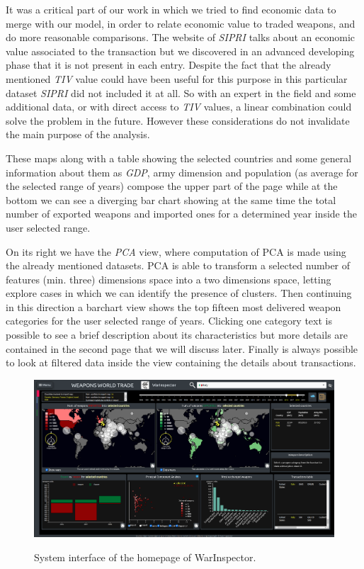 \documentclass{article}
\begin{document}
\begin{multicols}{2}
It was a critical part of our work in which we tried to find economic data to merge with our model, in order to relate economic value to traded weapons, and do more reasonable comparisons. The website of \textit{SIPRI} talks about an economic value associated to the transaction but we discovered in an advanced developing phase that it is not present in each entry. Despite the fact that the already mentioned \textit{TIV} value could have been useful for this purpose in this particular dataset \textit{SIPRI} did not included it at all. So with an expert in the field and some additional data, or with direct access to \textit{TIV} values, a linear combination could solve the problem in the future. However these considerations do not invalidate the main purpose of the analysis.

These maps along with a table showing the selected countries and some general information about them as \textit{GDP}, army dimension and population (as average for the selected range of years) compose the upper part of the page while at the bottom we can see a diverging bar chart showing at the same time the total number of exported weapons and imported ones for a determined year inside the user selected range. 

On its right we have the \textit{PCA} view, where computation of PCA is made using the already mentioned datasets. PCA is able to transform a selected number of features (min. three) dimensions space into a two dimensions space, letting explore cases in which we can identify the presence of clusters. Then continuing in this direction a barchart view shows the top fifteen most delivered weapon categories for the user selected range of years. Clicking one category text is possible to see a brief description about its characteristics but more details are contained in the second page that we will discuss later. Finally is always possible to look at filtered data inside the view containing the details about transactions.

\begin{figure}[H]
	\centering
	\includegraphics[scale=0.115,center]{./fig/screen1.png}
	\label{fig:va}
	\caption{System interface of the homepage of WarInspector.}
	

\end{figure}
\end{multicols}
\end{document}

